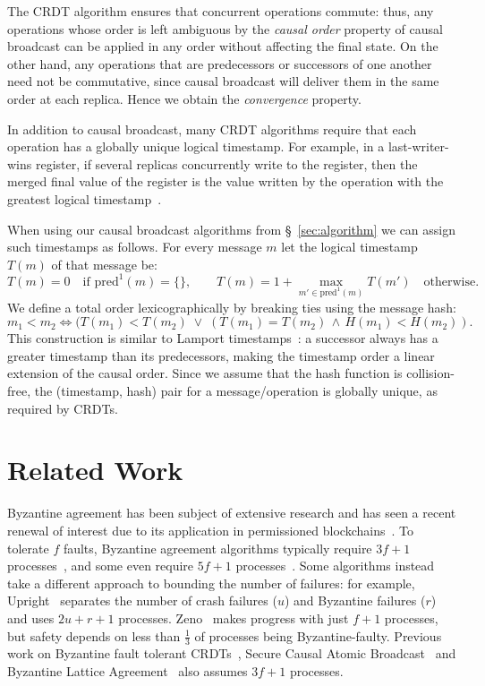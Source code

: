 \documentclass[a4paper,anonymous,USenglish]{lipics-v2019}
\begin{document}
The CRDT algorithm ensures that concurrent operations commute: thus, any operations whose order is left ambiguous by the \emph{causal order} property of causal broadcast can be applied in any order without affecting the final state.
On the other hand, any operations that are predecessors or successors of one another need not be commutative, since causal broadcast will deliver them in the same order at each replica.
Hence we obtain the \emph{convergence} property.

In addition to causal broadcast, many CRDT algorithms require that each operation has a globally unique logical timestamp.
For example, in a last-writer-wins register, if several replicas concurrently write to the register, then the merged final value of the register is the value written by the operation with the greatest logical timestamp~\cite{Shapiro:2011wy}.

When using our causal broadcast algorithms from \S~\ref{sec:algorithm} we can assign such timestamps as follows.
For every message $m$ let the logical timestamp $T(m)$ of that message be:
\[ T(m) = 0 \quad\text{if } \mathrm{pred}^1(m) = \{\}, \qquad
T(m) = 1 + \max_{m' \in \mathrm{pred}^1(m)} T(m') \quad\text{otherwise.} \]
We define a total order lexicographically by breaking ties using the message hash:
\[ m_1 < m_2 \iff (T(m_1) < T(m_2) \;\vee\; (T(m_1) = T(m_2) \,\wedge\, H(m_1) < H(m_2)). \]
This construction is similar to Lamport timestamps~\cite{Lamport:1978}: a successor always has a greater timestamp than its predecessors, making the timestamp order a linear extension of the causal order.
Since we assume that the hash function is collision-free, the (timestamp, hash) pair for a message/operation is globally unique, as required by CRDTs.

\section{Related Work}\label{sec:relwork}

Byzantine agreement has been subject of extensive research and has seen a recent renewal of interest due to its application in permissioned blockchains~\cite{Bano:2019}.
To tolerate $f$ faults, Byzantine agreement algorithms typically require $3f+1$ processes~\cite{Castro:1999,Kotla:2007,Bessani:2014}, and some even require $5f+1$ processes~\cite{Abd:2005,Martin:2006}.
Some algorithms instead take a different approach to bounding the number of failures: for example, Upright~\cite{Clement:2009} separates the number of crash failures ($u$) and Byzantine failures ($r$) and uses $2u+r+1$ processes.
Zeno~\cite{Singh:2009} makes progress with just $f+1$ processes, but safety depends on less than $\frac{1}{3}$ of processes being Byzantine-faulty.
Previous work on Byzantine fault tolerant CRDTs~\cite{Chai:2014,Shoker:2017,Zhao:2016}, Secure Causal Atomic Broadcast~\cite{Cachin:2001cj,Duan:2017} and Byzantine Lattice Agreement~\cite{DiLuna:2020} also assumes $3f+1$ processes.
\end{document}
